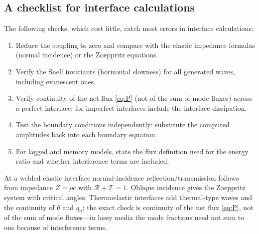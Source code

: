 \subsection{A checklist for interface calculations}
The following checks, which cost little, catch most errors in interface calculations:
\begin{enumerate}
\item Reduce the coupling to zero and compare with the elastic impedance formulas (normal incidence) or the Zoeppritz equations.
\item Verify the Snell invariants (horizontal slowness) for all generated waves, including evanescent ones.
\item Verify continuity of the net flux \eqref{eq:P} (not of the sum of mode fluxes) across a perfect interface; for imperfect interfaces include the interface dissipation.
\item Test the boundary conditions independently: substitute the computed amplitudes back into each boundary equation.
\item For lagged and memory models, state the flux definition used for the energy ratio and whether interference terms are included.
\end{enumerate}

\begin{summarybox}[Summary]
At a welded elastic interface normal-incidence reflection/transmission follows from impedance $Z=\rho c$ with $\mathcal R+\mathcal T=1$. Oblique incidence gives the Zoeppritz system with critical angles. Thermoelastic interfaces add thermal-type waves and the continuity of $\theta$ and $q_n$; the exact check is continuity of the net flux \eqref{eq:P}, not of the sum of mode fluxes---in lossy media the mode fractions need not sum to one because of interference terms.
\end{summarybox}

